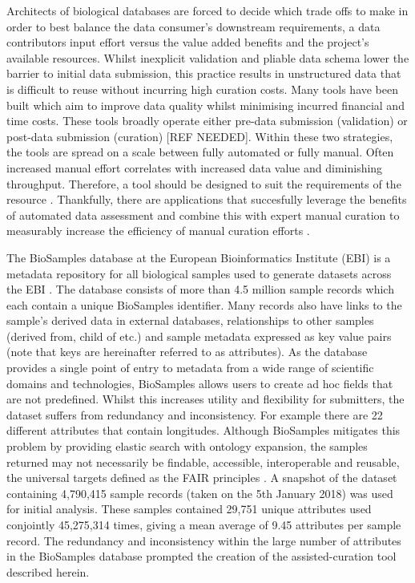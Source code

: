 \documentclass{bmcart}
\begin{document}
Architects of biological databases are forced to decide which trade offs to make in order to best balance the data consumer's downstream requirements, a data contributors input effort versus the value added benefits and the project's available resources. Whilst inexplicit validation and pliable data schema lower the barrier to initial data submission, this practice results in unstructured data that is difficult to reuse without incurring high curation costs. Many tools have been built which aim to improve data quality whilst minimising incurred financial and time costs. These tools broadly operate either pre-data submission (validation) or post-data submission (curation) [REF NEEDED]. Within these two strategies, the tools are spread on a scale between fully automated or fully manual. Often increased manual effort correlates with increased data value and diminishing throughput. Therefore, a tool should be designed to suit the requirements of the resource \cite{goble2008data}. Thankfully, there are applications that succesfully leverage the benefits of automated data assessment and combine this with expert manual curation to measurably increase the efficiency of manual curation efforts \cite{salgado2012myminer, salimi2006biocurator, szostak2015construction}.

The BioSamples database at the European Bioinformatics Institute (EBI) is a metadata repository for all biological samples used to generate datasets across the EBI \cite{gostev2011biosample, faulconbridge2013updates}. The database consists of more than 4.5 million sample records which each contain a unique BioSamples identifier. Many records also have links to the sample's derived data in external databases, relationships to other samples (derived from, child of etc.) and sample metadata expressed as key value pairs (note that keys are hereinafter referred to as attributes). As the database provides a single point of entry to metadata from a wide range of scientific domains and technologies, BioSamples allows users to create ad hoc fields that are not predefined. Whilst this increases utility and flexibility for submitters, the dataset suffers from redundancy and inconsistency. For example there are 22 different attributes that contain longitudes. Although BioSamples mitigates this problem by providing elastic search with ontology expansion, the samples returned may not necessarily be findable, accessible, interoperable and reusable, the universal targets defined as the FAIR principles \cite{wilkinson2016fair}. A snapshot of the dataset containing 4,790,415 sample records (taken on the 5th January 2018) was used for initial analysis. These samples contained 29,751 unique attributes used conjointly 45,275,314 times, giving a mean average of 9.45 attributes per sample record. The redundancy and inconsistency within the large number of attributes in the BioSamples database prompted the creation of the assisted-curation tool described herein.
\end{document}
